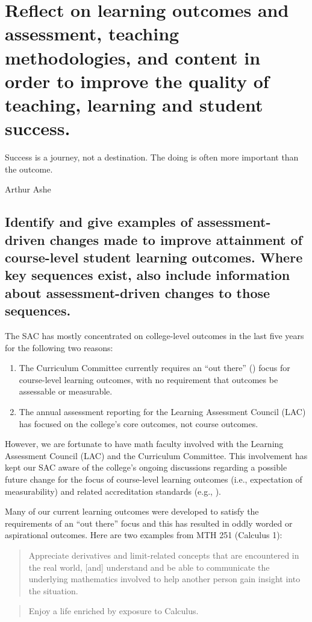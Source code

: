 \chapter[Outcomes and Assessment]{Reflect on learning outcomes and assessment,
teaching methodologies, and content in order to improve the quality of teaching,
learning and student success.}\label{chap:outcomes}
\epigraph{Success is a journey, not a destination. The doing is often more important than the outcome.}{Arthur Ashe}

\section[Course-level outcomes]{Identify and give examples of assessment-driven
changes made to improve attainment of course-level student learning outcomes.
Where key sequences exist, also include information about assessment-driven
changes to those sequences.}

The SAC has mostly concentrated on college-level outcomes in 
the last five years for the following two reasons: 
\begin{enumerate}
\item The Curriculum Committee currently requires an ``out there''
  (\cite{courseoutcomes}) focus for course-level learning outcomes, with no
  requirement that outcomes be assessable or measurable.  
\item The annual assessment reporting for the Learning Assessment Council (LAC)
  has focused on the college's core outcomes, not course outcomes.  
\end{enumerate}


However, we are fortunate to have math faculty involved with the Learning
Assessment Council (LAC) and the Curriculum Committee. This involvement has kept
our SAC aware of the college's ongoing discussions regarding a possible future
change for the focus of course-level learning outcomes  (i.e., expectation of
measurability) and related accreditation standards (e.g., \cite[Standard
4.A.3]{NWCCU}).

Many of our current learning outcomes were developed to satisfy the requirements
of an ``out there'' focus and this has resulted in oddly worded or aspirational
outcomes.  Here are two examples from MTH 251 (Calculus 1):

\begin{quote}
Appreciate derivatives and limit-related concepts that are encountered in the
real world, [and] understand and be able to communicate the underlying
mathematics involved to help another person gain insight into the situation.
\end{quote}
\begin{quote}
Enjoy a life enriched by exposure to Calculus.
\end{quote}

